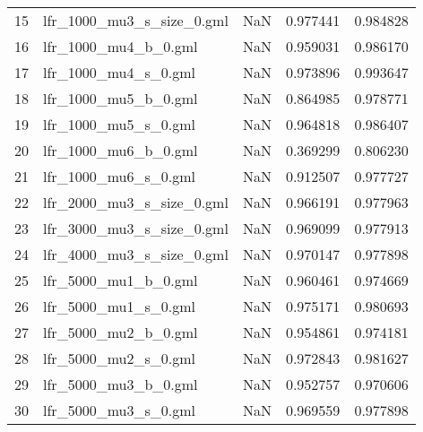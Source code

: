 \begin{tabular}{llrrr}
15 &   lfr\_1000\_mu3\_s\_size\_0.gml &                 NaN &                      0.977441 &                    0.984828 \\
16 &        lfr\_1000\_mu4\_b\_0.gml &                 NaN &                      0.959031 &                    0.986170 \\
17 &        lfr\_1000\_mu4\_s\_0.gml &                 NaN &                      0.973896 &                    0.993647 \\
18 &        lfr\_1000\_mu5\_b\_0.gml &                 NaN &                      0.864985 &                    0.978771 \\
19 &        lfr\_1000\_mu5\_s\_0.gml &                 NaN &                      0.964818 &                    0.986407 \\
20 &        lfr\_1000\_mu6\_b\_0.gml &                 NaN &                      0.369299 &                    0.806230 \\
21 &        lfr\_1000\_mu6\_s\_0.gml &                 NaN &                      0.912507 &                    0.977727 \\
22 &   lfr\_2000\_mu3\_s\_size\_0.gml &                 NaN &                      0.966191 &                    0.977963 \\
23 &   lfr\_3000\_mu3\_s\_size\_0.gml &                 NaN &                      0.969099 &                    0.977913 \\
24 &   lfr\_4000\_mu3\_s\_size\_0.gml &                 NaN &                      0.970147 &                    0.977898 \\
25 &        lfr\_5000\_mu1\_b\_0.gml &                 NaN &                      0.960461 &                    0.974669 \\
26 &        lfr\_5000\_mu1\_s\_0.gml &                 NaN &                      0.975171 &                    0.980693 \\
27 &        lfr\_5000\_mu2\_b\_0.gml &                 NaN &                      0.954861 &                    0.974181 \\
28 &        lfr\_5000\_mu2\_s\_0.gml &                 NaN &                      0.972843 &                    0.981627 \\
29 &        lfr\_5000\_mu3\_b\_0.gml &                 NaN &                      0.952757 &                    0.970606 \\
30 &        lfr\_5000\_mu3\_s\_0.gml &                 NaN &                      0.969559 &                    0.977898 \\

\end{tabular}
